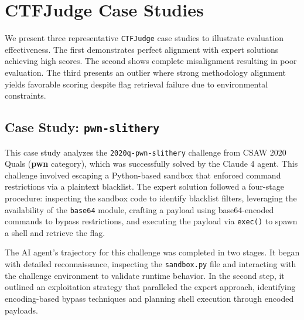 \section{CTFJudge Case Studies}
We present three representative \texttt{CTFJudge} case studies to illustrate evaluation effectiveness. The first demonstrates perfect alignment with expert solutions achieving high scores. The second shows complete misalignment resulting in poor evaluation. The third presents an outlier where strong methodology alignment yields favorable scoring despite flag retrieval failure due to environmental constraints.

\subsection{Case Study: \texttt{pwn-slithery}}

This case study analyzes the \texttt{2020q-pwn-slithery} challenge from CSAW 2020 Quals (\textbf{pwn} category), which was successfully solved by the Claude 4 agent. 
This challenge involved escaping a Python-based sandbox that enforced command restrictions via a plaintext blacklist. The expert solution followed a four-stage procedure: inspecting the sandbox code to identify blacklist filters, leveraging the availability of the \texttt{base64} module, crafting a payload using base64-encoded commands to bypass restrictions, and executing the payload via \texttt{exec()} to spawn a shell and retrieve the flag.

The AI agent’s trajectory for this challenge was completed in two stages. It began with detailed reconnaissance, inspecting the \texttt{sandbox.py} file and interacting with the challenge environment to validate runtime behavior. In the second step, it outlined an exploitation strategy that paralleled the expert approach, identifying encoding-based bypass techniques and planning shell execution through encoded payloads.


